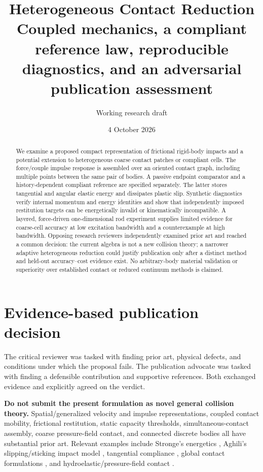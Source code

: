 \documentclass[11pt,a4paper]{article}
\title{Heterogeneous Contact Reduction\\\large Coupled mechanics, a compliant reference law, reproducible diagnostics, and an adversarial publication assessment}
\author{Working research draft}\date{4 October 2026}
\begin{document}
\maketitle
\begin{abstract}
We examine a proposed compact representation of frictional rigid-body impacts and a potential extension to heterogeneous coarse contact patches or compliant cells. The force/couple impulse response is assembled over an oriented contact graph, including multiple points between the same pair of bodies. A passive endpoint comparator and a history-dependent compliant reference are specified separately. The latter stores tangential and angular elastic energy and dissipates plastic slip. Synthetic diagnostics verify internal momentum and energy identities and show that independently imposed restitution targets can be energetically invalid or kinematically incompatible. A layered, force-driven one-dimensional rod experiment supplies limited evidence for coarse-cell accuracy at low excitation bandwidth and a counterexample at high bandwidth. Opposing research reviewers independently examined prior art and reached a common decision: the current algebra is not a new collision theory; a narrower adaptive heterogeneous reduction could justify publication only after a distinct method and held-out accuracy--cost evidence exist. No arbitrary-body material validation or superiority over established contact or reduced continuum methods is claimed.
\end{abstract}
\section{Evidence-based publication decision}
The critical reviewer was tasked with finding prior art, physical defects, and conditions under which the proposal fails. The publication advocate was tasked with finding a defensible contribution and supportive references. Both exchanged evidence and explicitly agreed on the verdict.

\textbf{Do not submit the present formulation as novel general collision theory.} Spatial/generalized velocity and impulse representations, coupled contact mobility, frictional restitution, static capacity thresholds, simultaneous-contact assembly, coarse pressure-field contact, and connected discrete bodies all have substantial prior art. Relevant examples include Stronge's energetics \cite{stronge}, Aghili's slipping/sticking impact model \cite{aghili}, tangential compliance \cite{maw}, global contact formulations \cite{anitescu}, and hydroelastic/pressure-field contact \cite{elandt}.
\end{document}
